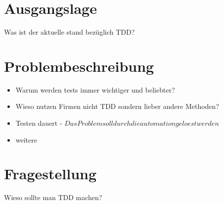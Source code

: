 \section{Ausgangslage}
Was ist der aktuelle stand bezüglich TDD?

\section{Problembeschreibung}
\begin{itemize}
	\item Warum werden tests immer wichtiger und beliebter?
	\item Wieso nutzen Firmen nicht TDD sondern lieber andere Methoden?
	\item Testen dauert - $Das Problem soll durch die automation geloest werden$
	\item weitere
\end{itemize}

\section{Fragestellung}
Wieso sollte man TDD machen?
